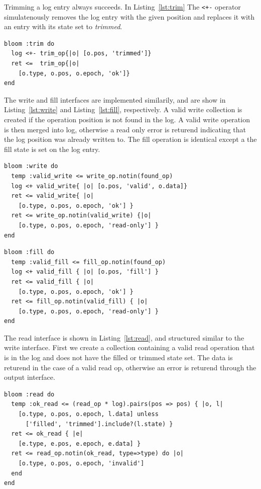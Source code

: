 \documentclass[10pt,twocolumn]{article}
\begin{document}
Trimming a log entry always succeeds. In Listing~\ref{lst:trim} The
\texttt{<+-} operator simulatenously removes the log entry with the given 
position and replaces it with an entry with its state set to \emph{trimmed}.

\begin{lstlisting}[caption={Trim}, label=lst:trim]
bloom :trim do
  log <+- trim_op{|o| [o.pos, 'trimmed']}
  ret <=  trim_op{|o|
    [o.type, o.pos, o.epoch, 'ok']}
end
\end{lstlisting}

The write and fill interfaces are implemented similarily, and are show in
Listing~\ref{lst:write} and Listing~\ref{lst:fill}, respectively.  A valid
write collection is created if the operation position is not found in the log.
A valid write operation is then merged into log, otherwise a read only error is
returend indicating that the log position was already written to.
The fill operation is identical except a the fill state is set on the log entry.

\begin{lstlisting}[caption={Write}, label=lst:write]
bloom :write do
  temp :valid_write <= write_op.notin(found_op)
  log <+ valid_write{ |o| [o.pos, 'valid', o.data]}
  ret <= valid_write{ |o|
    [o.type, o.pos, o.epoch, 'ok'] }
  ret <= write_op.notin(valid_write) {|o|
    [o.type, o.pos, o.epoch, 'read-only'] }
end
\end{lstlisting}

\begin{lstlisting}[caption={Fill}, label=lst:fill]
bloom :fill do
  temp :valid_fill <= fill_op.notin(found_op)
  log <+ valid_fill { |o| [o.pos, 'fill'] }
  ret <= valid_fill { |o|
    [o.type, o.pos, o.epoch, 'ok'] }
  ret <= fill_op.notin(valid_fill) { |o|
    [o.type, o.pos, o.epoch, 'read-only'] }
end
\end{lstlisting}

The read interface is shown in Listing~\ref{lst:read}, and structured similar
to the write interface. First we create a collection containing a valid read
operation that is in the log and does not have the filled or trimmed state set.
The data is returend in the case of a valid read op, otherwise an error is
returend through the output interface.

\begin{lstlisting}[caption={Read}, label=lst:read]
bloom :read do
  temp :ok_read <= (read_op * log).pairs(pos => pos) { |o, l|
    [o.type, o.pos, o.epoch, l.data] unless
      ['filled', 'trimmed'].include?(l.state) }
  ret <= ok_read { |e|
    [e.type, e.pos, e.epoch, e.data] }
  ret <= read_op.notin(ok_read, type=>type) do |o|
    [o.type, o.pos, o.epoch, 'invalid']
  end
end
\end{lstlisting}
\end{document}
